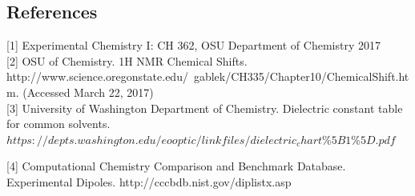 \documentclass[8.5pt,twoside,twocolumn]{article}
\begin{document}
\begin{@twocolumnfalse}
\section{References}
[1] Experimental Chemistry I: CH 362, OSU Department of Chemistry 2017\\

[2] OSU of Chemistry. 1H NMR Chemical Shifts. http://www.science.oregonstate.edu/~gablek/CH335/Chapter10/ChemicalShift.htm. (Accessed March 22, 2017)\\

[3] University of Washington Department of Chemistry. Dielectric constant table for common solvents. $https://depts.washington.edu/eooptic/linkfiles/dielectric_chart$\%$5B1$\%$5D.pdf$

[4] Computational Chemistry Comparison and Benchmark Database. Experimental Dipoles. http://cccbdb.nist.gov/diplistx.asp
\end{@twocolumnfalse}
\end{document}
